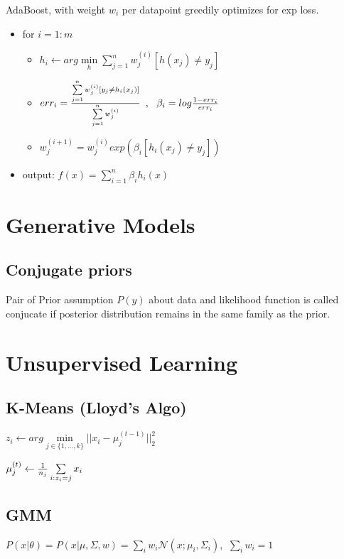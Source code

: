 \documentclass[11pt,twocolumn]{article}
\begin{document}
AdaBoost, with weight $w_i$ per datapoint greedily optimizes for exp loss.
\begin{itemize}
\item for $i=1:m$
\begin{itemize}
\item $h_i \leftarrow arg \min \limits_h \sum \limits_{j=1}^n  w_j^{(i)}[h(x_j) \neq y_j]$
\item $err_i = {{\sum \limits_{j=1}^n w_j^{(i)}[y_j \neq h_i(x_j)]}\over{\sum \limits_{j=1}^n w_j^{(i)}}} $
$,~~\beta_i = log {{1-err_i}\over{err_i}}$

\item $w_j^{(i+1)} = w_j^{(i)} exp(\beta_i [h_i(x_j) \neq y_j])$
\end{itemize}
\item output: $f(x) = \sum \limits_{i=1}^n \beta_i h_i (x)$
\end{itemize}


\section{Generative Models}

\subsection{Conjugate priors}
Pair of Prior assumption $P(y)$ about data and likelihood function is called conjucate if posterior distribution remains in the same family as the prior.	

\section{Unsupervised Learning}
\subsection{K-Means (Lloyd's Algo)}

$z_i \leftarrow arg \min \limits_{j \in \lbrace 1,...,k \rbrace } || x_i - \mu_j^{(t-1)} ||_2^2 $

$ \mu_j^{(t)} \leftarrow {1 \over {n_j}} \sum \limits_{i:z_i = j} x_i$


\subsection{GMM}

$P(x|\theta) = P(x|\mu, \Sigma, w) = \sum \limits_i w_i \mathcal{N} (x;\mu_i, \Sigma_i)$, $~\sum \limits_i w_i = 1$
\end{document}
